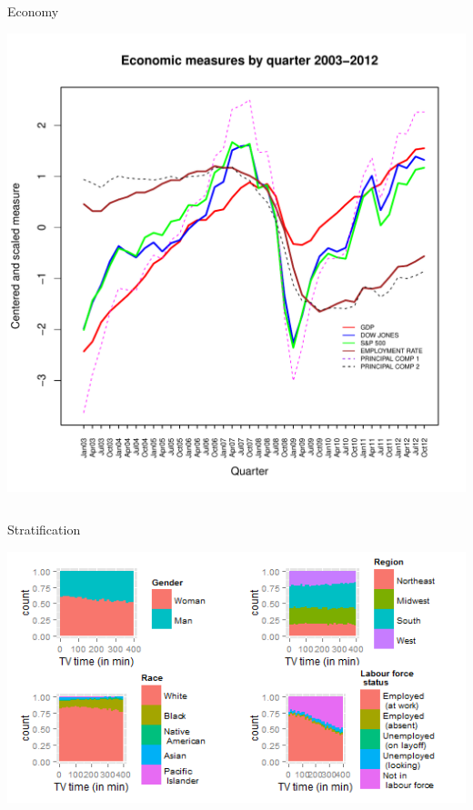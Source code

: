 \documentclass[final]{beamer}
\newcounter{acolumn}%
\def\autoheight{\vspace*{0pt}}%
\begin{document}
\begin{frame}
\begin{acolumns}[t]
              \begin{column}{.24\linewidth}
                \begin{block}{Economy}
                  \begin{center}
                  \includegraphics{econ_measures.pdf}
                  \end{center}
                  
                  \autoheight 
                \end{block}
        
              \end{column}
              
              \begin{column}{.24\linewidth}
               \begin{block}{Stratification}
                \begin{center}
                \includegraphics{stratification}
                \end{center}
               

\end{block}
\end{column}
\end{acolumns}
\end{frame}
\end{document}
